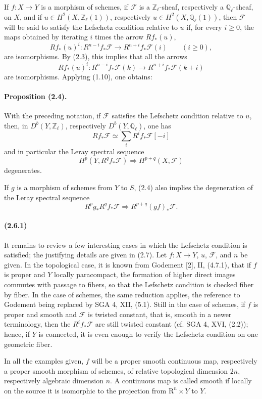 \documentclass[10pt]{article}
\newcommand{\Fcal}{\mathcal F}
\newcommand{\Z}{\mathbb Z}
\newcommand{\Q}{\mathbb Q}
\newcommand{\R}{\mathrm R}
\begin{document}
If $f:X\to Y$ is a morphism of schemes, if $\Fcal$ is a $\Z_\ell$-sheaf, respectively a $\Q_\ell$-sheaf, on $X$, and if $u\in H^2(X,\Z_\ell(1))$, respectively $u\in H^2(X,\Q_\ell(1))$, then $\Fcal$ will be said to satisfy the Lefschetz condition relative to $u$ if, for every $i\ge0$, the maps obtained by iterating $i$ times the arrow $Rf_*(u)$,
\[
Rf_*(u)^i:R^{n-i}f_*\Fcal\longrightarrow R^{n+i}f_*\Fcal(i)\qquad(i\ge0),
\]
are isomorphisms. By (2.3), this implies that all the arrows
\[
Rf_*(u)^i:R^{n-i}f_*\Fcal(k)\longrightarrow R^{n+i}f_*\Fcal(k+i)
\]
are isomorphisms. Applying (1.10), one obtains:

\paragraph{Proposition (2.4).} With the preceding notation, if $\Fcal$ satisfies the Lefschetz condition relative to $u$, then, in $D^b(Y,\Z_\ell)$, respectively $D^b(Y,\Q_\ell)$, one has
\[
\tag{2.5}
Rf_*\Fcal\simeq\sum_iR^if_*\Fcal[-i]
\]
and in particular the Leray spectral sequence
\[
H^p(Y,R^qf_*\Fcal)\Longrightarrow H^{p+q}(X,\Fcal)
\]
degenerates.



If $g$ is a morphism of schemes from $Y$ to $S$, (2.4) also implies the degeneration of the Leray spectral sequence
\[
R^p g_* R^q f_*\mathcal F\Longrightarrow R^{p+q}(gf)_*\mathcal F.
\]

\paragraph{(2.6.1)} It remains to review a few interesting cases in which the Lefschetz condition is satisfied; the justifying details are given in (2.7). Let $f:X\to Y$, $u$, $\mathcal F$, and $n$ be given. In the topological case, it is known from Godement [2], II, (4.7.1), that if $f$ is proper and $Y$ locally paracompact, the formation of higher direct images commutes with passage to fibers, so that the Lefschetz condition is checked fiber by fiber. In the case of schemes, the same reduction applies, the reference to Godement being replaced by SGA 4, XII, (5.1). Still in the case of schemes, if $f$ is proper and smooth and $\mathcal F$ is twisted constant, that is, smooth in a newer terminology, then the $R^if_*\mathcal F$ are still twisted constant (cf. SGA 4, XVI, (2.2)); hence, if $Y$ is connected, it is even enough to verify the Lefschetz condition on one geometric fiber.

In all the examples given, $f$ will be a proper smooth continuous map, respectively a proper smooth morphism of schemes, of relative topological dimension $2n$, respectively algebraic dimension $n$. A continuous map is called smooth if locally on the source it is isomorphic to the projection from $\R^n\times Y$ to $Y$.
\end{document}
